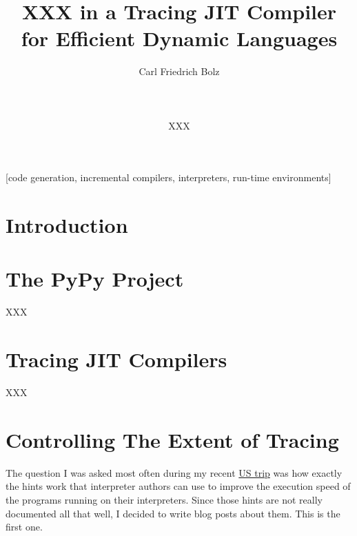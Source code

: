\documentclass{sig-alternate}
\begin{document}
\title{XXX in a Tracing JIT Compiler for Efficient Dynamic Languages}

\author{
\alignauthor Carl Friedrich Bolz\\
       \\
       \\
       \\
\alignauthor XXX
       \\
}

\maketitle

[code generation,
incremental compilers, interpreters, run-time environments]

\begin{abstract}


\end{abstract}


\section{Introduction}


\section{The PyPy Project}
\label{sect:pypy}

XXX


\section{Tracing JIT Compilers}
\label{sect:tracing}

XXX

\section{Controlling The Extent of Tracing}

The question I was asked most often during my recent \href{http://morepypy.blogspot.com/2011/03/us-trip-report-popl-microsoft-ibm.html}{US trip} was how exactly
the hints work that interpreter authors can use to improve the execution speed
of the programs running on their interpreters. Since those hints are not really
documented all that well, I decided to write blog posts about them. This is the
first one.
\end{document}
